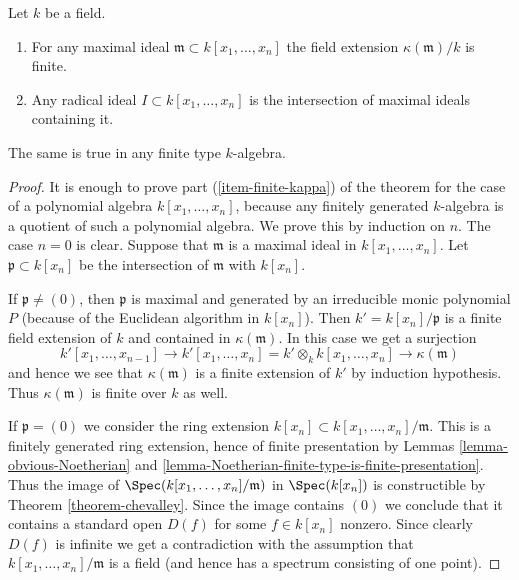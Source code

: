 \begin{theorem}
\label{theorem-nullstellensatz}
Let $k$ be a field.
\begin{enumerate}
\item
\label{item-finite-kappa}
For any maximal ideal $\mathfrak m \subset k[x_1, \ldots, x_n]$
the field extension $\kappa(\mathfrak m)/k$ is finite.
\item
\label{item-polynomial-ring-Jacobson}
Any radical ideal $I \subset k[x_1, \ldots, x_n]$
is the intersection of maximal ideals containing it.
\end{enumerate}
The same is true in any finite type $k$-algebra.
\end{theorem}

\begin{proof}
It is enough to prove part (\ref{item-finite-kappa}) of
the theorem for the case of a polynomial
algebra $k[x_1, \ldots, x_n]$, because any finitely generated
$k$-algebra is a quotient of such a polynomial algebra.
We prove this by induction on $n$. The case $n = 0$ is clear.
Suppose that $\mathfrak m$ is a maximal ideal in $k[x_1, \ldots, x_n]$.
Let $\mathfrak p \subset k[x_n]$ be the intersection
of $\mathfrak m$ with $k[x_n]$.

\medskip\noindent
If $\mathfrak p \not = (0)$,
then $\mathfrak p$ is maximal and generated by an irreducible
monic polynomial $P$ (because of the Euclidean algorithm
in $k[x_n]$). Then
$k' = k[x_n]/\mathfrak p$ is a finite field extension of $k$
and contained in $\kappa(\mathfrak m)$. In this case
we get a surjection
$$
k'[x_1, \ldots, x_{n-1}]
\to
k'[x_1, \ldots, x_n] =
k' \otimes_k k[x_1, \ldots, x_n]
\longrightarrow
\kappa(\mathfrak m)
$$
and hence we see that $\kappa(\mathfrak m)$ is a finite
extension  of $k'$ by induction hypothesis. Thus $\kappa(\mathfrak m)$
is finite over $k$ as well.

\medskip\noindent
If $\mathfrak p = (0)$ we consider the ring
extension $k[x_n] \subset k[x_1, \ldots, x_n]/\mathfrak m$.
This is a finitely generated ring extension, hence
of finite presentation by
Lemmas \ref{lemma-obvious-Noetherian} and
\ref{lemma-Noetherian-finite-type-is-finite-presentation}.
Thus the image of $\Spec(k[x_1, \ldots, x_n]/\mathfrak m)$
in $\Spec(k[x_n])$ is constructible by
Theorem \ref{theorem-chevalley}. Since the image
contains $(0)$ we conclude that it contains a standard
open $D(f)$ for some $f\in k[x_n]$ nonzero. Since clearly
$D(f)$ is infinite we get a contradiction with the
assumption that $k[x_1, \ldots, x_n]/\mathfrak m$ is
a field (and hence has a spectrum consisting of one point).


\end{proof}
